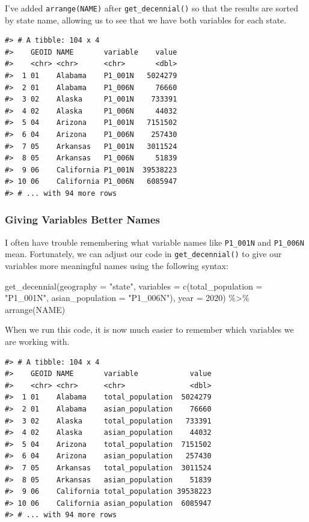 \documentclass[
]{book}
\newenvironment{Shaded}{\begin{snugshade}}{\end{snugshade}}
\newcommand{\AttributeTok}[1]{\textcolor[rgb]{0.77,0.63,0.00}{#1}}
\newcommand{\DecValTok}[1]{\textcolor[rgb]{0.00,0.00,0.81}{#1}}
\newcommand{\FunctionTok}[1]{\textcolor[rgb]{0.00,0.00,0.00}{#1}}
\newcommand{\NormalTok}[1]{#1}
\newcommand{\SpecialCharTok}[1]{\textcolor[rgb]{0.00,0.00,0.00}{#1}}
\newcommand{\StringTok}[1]{\textcolor[rgb]{0.31,0.60,0.02}{#1}}
\begin{document}
I've added \texttt{arrange(NAME)} after \texttt{get\_decennial()} so that the results are sorted by state name, allowing us to see that we have both variables for each state.

\begin{verbatim}
#> # A tibble: 104 x 4
#>    GEOID NAME       variable    value
#>    <chr> <chr>      <chr>       <dbl>
#>  1 01    Alabama    P1_001N   5024279
#>  2 01    Alabama    P1_006N     76660
#>  3 02    Alaska     P1_001N    733391
#>  4 02    Alaska     P1_006N     44032
#>  5 04    Arizona    P1_001N   7151502
#>  6 04    Arizona    P1_006N    257430
#>  7 05    Arkansas   P1_001N   3011524
#>  8 05    Arkansas   P1_006N     51839
#>  9 06    California P1_001N  39538223
#> 10 06    California P1_006N   6085947
#> # ... with 94 more rows
\end{verbatim}

\hypertarget{giving-variables-better-names}{%
\subsubsection*{Giving Variables Better Names}\label{giving-variables-better-names}}

I often have trouble remembering what variable names like \texttt{P1\_001N} and \texttt{P1\_006N} mean. Fortunately, we can adjust our code in \texttt{get\_decennial()} to give our variables more meaningful names using the following syntax:

\begin{Shaded}
\begin{Highlighting}[]
\FunctionTok{get\_decennial}\NormalTok{(}\AttributeTok{geography =} \StringTok{"state"}\NormalTok{, }
              \AttributeTok{variables =} \FunctionTok{c}\NormalTok{(}\AttributeTok{total\_population =} \StringTok{"P1\_001N"}\NormalTok{, }
                            \AttributeTok{asian\_population =} \StringTok{"P1\_006N"}\NormalTok{),}
              \AttributeTok{year =} \DecValTok{2020}\NormalTok{) }\SpecialCharTok{\%\textgreater{}\%} 
  \FunctionTok{arrange}\NormalTok{(NAME)}
\end{Highlighting}
\end{Shaded}

When we run this code, it is now much easier to remember which variables we are working with.

\begin{verbatim}
#> # A tibble: 104 x 4
#>    GEOID NAME       variable            value
#>    <chr> <chr>      <chr>               <dbl>
#>  1 01    Alabama    total_population  5024279
#>  2 01    Alabama    asian_population    76660
#>  3 02    Alaska     total_population   733391
#>  4 02    Alaska     asian_population    44032
#>  5 04    Arizona    total_population  7151502
#>  6 04    Arizona    asian_population   257430
#>  7 05    Arkansas   total_population  3011524
#>  8 05    Arkansas   asian_population    51839
#>  9 06    California total_population 39538223
#> 10 06    California asian_population  6085947
#> # ... with 94 more rows
\end{verbatim}
\end{document}
